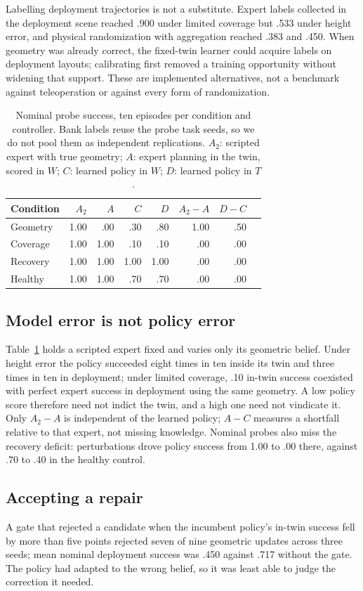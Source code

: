 \documentclass[conference]{IEEEtran}
\begin{document}
Labelling deployment trajectories is not a substitute. Expert labels collected in the deployment scene reached .900 under limited coverage but .533 under height error, and physical randomization with aggregation reached .383 and .450. When geometry was already correct, the fixed-twin learner could acquire labels on deployment layouts; calibrating first removed a training opportunity without widening that support. These are implemented alternatives, not a benchmark against teleoperation or against every form of randomization.

\begin{table}[t]
\centering\caption{Nominal probe success, ten episodes per condition and controller. Bank labels reuse the probe task seeds, so we do not pool them as independent replications. $A_2$: scripted expert with true geometry; $A$: expert planning in the twin, scored in $W$; $C$: learned policy in $W$; $D$: learned policy in $T$.}\label{tab:probe}
\begin{tabular}{@{}lrrrrrrr@{}}\toprule
Condition & $A_2$ & $A$ & $C$ & $D$ & $A_2\!-\!A$ & $D\!-\!C$\\\midrule
Geometry & 1.00 & .00 & .30 & .80 & 1.00 & .50\\
Coverage & 1.00 & 1.00 & .10 & .10 & .00 & .00\\
Recovery & 1.00 & 1.00 & 1.00 & 1.00 & .00 & .00\\
Healthy & 1.00 & 1.00 & .70 & .70 & .00 & .00\\\bottomrule
\end{tabular}
\end{table}
\subsection{Model error is not policy error}
Table~\ref{tab:probe} holds a scripted expert fixed and varies only its geometric belief. Under height error the policy succeeded eight times in ten inside its twin and three times in ten in deployment; under limited coverage, .10 in-twin success coexisted with perfect expert success in deployment using the same geometry. A low policy score therefore need not indict the twin, and a high one need not vindicate it. Only $A_2-A$ is independent of the learned policy; $A-C$ measures a shortfall relative to that expert, not missing knowledge. Nominal probes also miss the recovery deficit: perturbations drove policy success from 1.00 to .00 there, against .70 to .40 in the healthy control.

\subsection{Accepting a repair}
A gate that rejected a candidate when the incumbent policy's in-twin success fell by more than five points rejected seven of nine geometric updates across three seeds; mean nominal deployment success was .450 against .717 without the gate. The policy had adapted to the wrong belief, so it was least able to judge the correction it needed.
\end{document}
